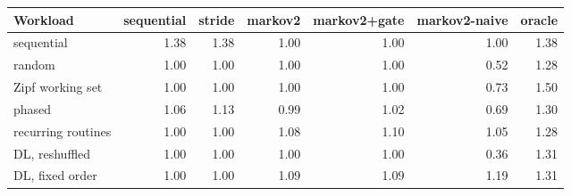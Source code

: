\begin{tabular}{@{}lrrrrrr@{}}
\toprule
Workload & sequential & stride & markov2 & markov2+gate & markov2-naive & oracle \\
\midrule
sequential & 1.38 & 1.38 & 1.00 & 1.00 & 1.00 & 1.38 \\
random & 1.00 & 1.00 & 1.00 & 1.00 & 0.52 & 1.28 \\
Zipf working set & 1.00 & 1.00 & 1.00 & 1.00 & 0.73 & 1.50 \\
phased & 1.06 & 1.13 & 0.99 & 1.02 & 0.69 & 1.30 \\
recurring routines & 1.00 & 1.00 & 1.08 & 1.10 & 1.05 & 1.28 \\
DL, reshuffled & 1.00 & 1.00 & 1.00 & 1.00 & 0.36 & 1.31 \\
DL, fixed order & 1.00 & 1.00 & 1.09 & 1.09 & 1.19 & 1.31 \\
\bottomrule
\end{tabular}

